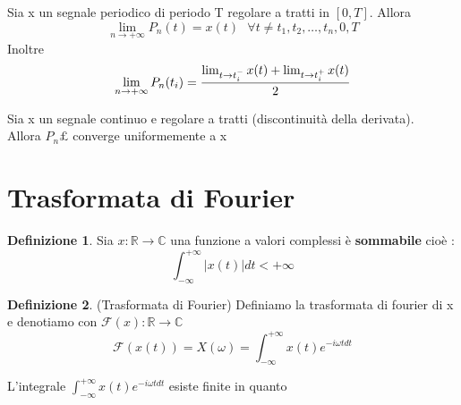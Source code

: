 \documentclass{article}
\theoremstyle{definition}
\newtheorem*{definizione}{Definizione}
\newcommand{\R}{\mathbb{R}}
\newcommand{\intinf}{\int_{-\infty}^{+\infty}}
\newcommand{\f}{\mathscr{F}}
\begin{document}
	\begin{teo}{}{}
		Sia x un segnale periodico di periodo T regolare a tratti in $\left[0,T\right]$. Allora 
		$$\lim_{n\rightarrow +\infty}P_n(t)=x(t) \ \ \ \forall t \neq t_1,t_2,\dots,t_n,0,T$$
		Inoltre 
		$$\lim_{n\rightarrow +\infty}P_n(t_i)= \frac{\lim_{t \rightarrow t_i^-} x(t)+ \lim_{t \rightarrow t_i^+} x(t)\\}{2} $$
	\end{teo}
	\begin{teo}{}{}
		Sia x un segnale continuo e regolare  a tratti (discontinuità della derivata).\\
		Allora $P_n£$ converge uniformemente a x
		\end{teo}

\newpage 
\section{Trasformata di Fourier}
\begin{definizione}
	Sia $x: \R \rightarrow \mathbb{C}$ una funzione a valori complessi è \textbf{sommabile} cioè : 
	$$\intinf |x(t)|dt < + \infty $$
\end{definizione}
\begin{definizione}(Trasformata di Fourier) \newline
Definiamo la trasformata di fourier di x  e denotiamo con 	$\f(x): \R \rightarrow \mathbb{C}$ 
$$\f(x(t))=X(\omega)=\intinf x(t)e^{-i\omega tdt}$$
\end{definizione}
L'integrale $\intinf x(t)e^{-i\omega tdt}$ esiste finite in quanto 
\begin{align*}
\end{align*}
\end{document}
